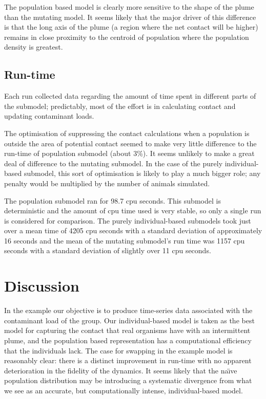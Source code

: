 The population based model is clearly more sensitive to the shape of the plume
than the mutating model. It seems likely that the major driver of this
difference is that the long axis of the plume (a region where the net contact
will be higher) remains in close proximity to the centroid of population where
the population density is greatest.

\subsection{Run-time}

Each run collected data regarding the amount of time spent in different parts
of the submodel; predictably, most of the effort is in calculating contact and
updating contaminant loads.

The optimisation of suppressing the contact calculations when a population is
outside the area of potential contact seemed to make very little difference to
the run-time of population submodel (about 3\%). It seems unlikely to make a
great deal of difference to the mutating submodel. In the case of the purely
individual-based submodel, this sort of optimisation is likely to play a much
bigger role; any penalty would be multiplied by the number of animals
simulated.

The population submodel ran for 98.7 cpu seconds. This submodel is
deterministic and the amount of cpu time used is very stable, so only a single
run is considered for comparison. The purely individual-based submodels took
just over a mean time of 4205 cpu seconds with a standard deviation of
approximately 16 seconds and the mean of the mutating submodel's run time was
1157 cpu seconds with a standard deviation of slightly over 11 cpu seconds.

\section{Discussion}

In the example our objective is to produce time-series data associated with
the contaminant load of the group. Our individual-based model is taken as the
best model for capturing the contact that real organisms have with an
intermittent plume, and the population based representation has a
computational efficiency that the individuals lack. The case for swapping in
the example model is reasonably clear: there is a distinct improvement in
run-time with no apparent deterioration in the fidelity of the dynamics. It
seems likely that the na\"{\i}ve population distribution may be introducing a
systematic divergence from what we see as an accurate, but computationally
intense, individual-based model.

